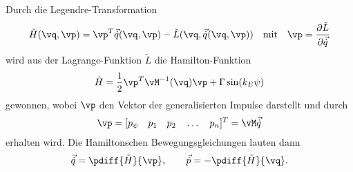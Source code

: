%
%
Durch die Legendre-Transformation
%
%
%
\begin{equation}
	\tilde{H} (\vq,\vp)= \vp^T \vec{\dot{q}}(\vq,\vp) - \tilde{L} (\vq,\vec{\dot{q}}(\vq,\vp))			 \quad 				\text{mit} \quad \vp = \frac{\partial \tilde{L}}{\partial \vec{\dot{q}}}
	\label{eq:LegendreTrafoMehrereAbsorber}
\end{equation}
wird aus der Lagrange-Funktion $\tilde{L}$ die Hamilton-Funktion
%
%
%
\begin{equation}
	\tilde{H} = \frac{1}{2} \vp^T \vM^{-1}(\vq) \vp + \Gamma \sin(k_E \psi)
	\label{eq:HamiltonfunktionMehrereAbsorber}
\end{equation}
gewonnen, wobei $\vp$ den Vektor der generalisierten Impulse darstellt und durch
%
%
\begin{equation}
	\vp = [p_{\psi} \quad p_1 \quad p_2 \quad \dots \quad p_n]^T = \vM \vec{\dot{q}}
	\label{eq:GeneralisierteImpulseMehrereAbsorber}
\end{equation}
erhalten wird. Die Hamiltonschen Bewegungsgleichungen lauten dann 
\begin{equation}
	\vec{\dot{q}} = \pdiff{\tilde{H}}{{\vp}}, 					\qquad \vec{\dot{p}} = - \pdiff{\tilde{H}}{{\vq}}.
	\label{eq:HamiltonscheBewegungsgleichungenAllgmeineMehrereAbsorber}
\end{equation}

